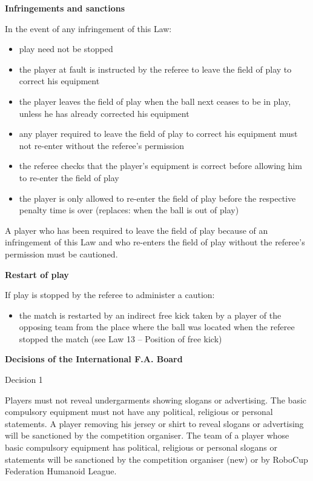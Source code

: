 {\bfseries Infringements and sanctions}

\headlinebox

In the event of any infringement of this Law:

\begin{itemize}
\item play need not be stopped
\item the player at fault is instructed by the referee to leave the field of play to correct his equipment
\item the player leaves the field of play when the ball next ceases to be in play, unless he has already corrected his equipment
\item any player required to leave the field of play to correct his equipment must not re-enter without the referee's permission
\item the referee checks that the player's equipment is correct before allowing him to re-enter the field of play 
\item the player is only allowed to re-enter the field of play before the respective penalty time is over {\color[rgb]{0.4,0.4,0.4} (replaces: when the ball is out of play)}
\end{itemize}

\bigskip

A player who has been required to leave the field of play because of an infringement of this Law and who re-enters the field of play without the referee's permission must be cautioned.

\bigskip

{\bfseries Restart of play}

\headlinebox

If play is stopped by the referee to administer a caution:

\begin{itemize}
\item the match is restarted by an indirect free kick taken by a player of the opposing team from the place where the ball was located when the referee stopped the match (see Law 13 -- Position of free kick)
\end{itemize}

\bigskip

\clearpage
{\bfseries Decisions of the International F.A. Board }

\headlinebox

Decision 1

Players must not reveal undergarments showing slogans or advertising. The basic compulsory equipment must not have any political, religious or personal statements. A player removing his jersey or shirt to reveal slogans or advertising will be sanctioned by the competition organiser. The team of a player whose basic compulsory equipment has political, religious or personal slogans or statements will be sanctioned by the competition organiser (new) or by RoboCup Federation Humanoid League.

